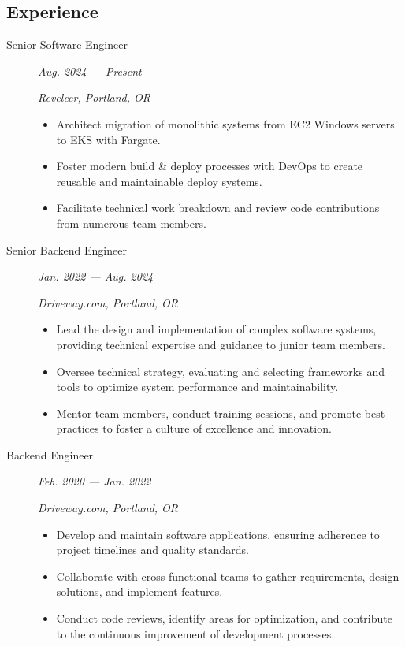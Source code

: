 \documentclass{article}
\def \intraspace {0.1em}
\begin{document}

\subsection*{Experience}

    \begin{description}
		
    \item[Senior Software Engineer] \hfill \textit{Aug. 2024 — Present}
    
        \textit{Reveleer, Portland, OR}
		\begin{itemize}
    	\item Architect migration of monolithic systems from EC2 Windows servers to EKS with Fargate.
    	\item Foster modern build \& deploy processes with DevOps to create reusable and maintainable deploy systems.
    	\item Facilitate technical work breakdown and review code contributions from numerous team members.
		\end{itemize}
        \vspace{\intraspace}
		
	\item[Senior Backend Engineer] \hfill \textit{Jan. 2022 — Aug. 2024}
	
        \textit{Driveway.com, Portland, OR}
		\begin{itemize}
    	\item Lead the design and implementation of complex software systems, providing technical expertise and guidance to junior team members.
    	\item Oversee technical strategy, evaluating and selecting frameworks and tools to optimize system performance and maintainability.
    	\item Mentor team members, conduct training sessions, and promote best practices to foster a culture of excellence and innovation.	
		\end{itemize}
		\vspace{\intraspace}
	
	\item[Backend Engineer] \hfill \textit{Feb. 2020 — Jan. 2022}
		
        \textit{Driveway.com, Portland, OR}
        \begin{itemize}
		\item Develop and maintain software applications, ensuring adherence to project timelines and quality standards.
    	\item Collaborate with cross-functional teams to gather requirements, design solutions, and implement features.
    	\item Conduct code reviews, identify areas for optimization, and contribute to the continuous improvement of development processes.
        \end{itemize}
		\vspace{\intraspace}


\end{description}
\end{document}
